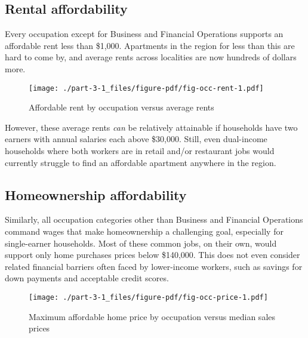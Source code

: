 \documentclass[
  letterpaper,
  DIV=11,
  numbers=noendperiod]{scrreprt}
\begin{document}
\hypertarget{rental-affordability-1}{%
\subsection{Rental affordability}\label{rental-affordability-1}}

Every occupation except for Business and Financial Operations supports
an affordable rent less than \$1,000. Apartments in the region for less
than this are hard to come by, and average rents across localities are
now hundreds of dollars more.

\begin{figure}

{\centering \texttt{[image: ./part-3-1\_files/figure-pdf/fig-occ-rent-1.pdf]}

}

\caption{\label{fig-occ-rent}Affordable rent by occupation versus
average rents}

\end{figure}

However, these average rents \emph{can} be relatively attainable if
households have two earners with annual salaries each above \$30,000.
Still, even dual-income households where both workers are in retail
and/or restaurant jobs would currently struggle to find an affordable
apartment anywhere in the region.

\hypertarget{homeownership-affordability-1}{%
\subsection{Homeownership
affordability}\label{homeownership-affordability-1}}

Similarly, all occupation categories other than Business and Financial
Operations command wages that make homeownership a challenging goal,
especially for single-earner households. Most of these common jobs, on
their own, would support only home purchases prices below \$140,000.
This does not even consider related financial barriers often faced by
lower-income workers, such as savings for down payments and acceptable
credit scores.

\begin{figure}

{\centering \texttt{[image: ./part-3-1\_files/figure-pdf/fig-occ-price-1.pdf]}

}

\caption{\label{fig-occ-price}Maximum affordable home price by
occupation versus median sales prices}

\end{figure}
\end{document}
